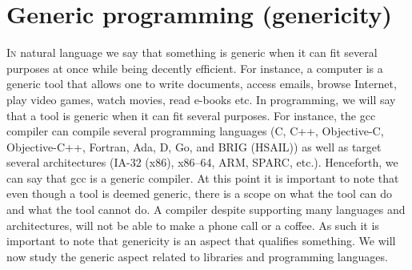 \chapter{Generic programming (genericity)}
\label{chap:genericity}

\lettrine[lines=2]{I}{n} natural language we say that something is generic when it can fit several purposes at once
while being decently efficient. For instance, a computer is a generic tool that allows one to write documents, access
emails, browse Internet, play video games, watch movies, read e-books etc. In programming, we will say that a tool is
generic when it can fit several purposes. For instance, the gcc compiler can compile several programming languages (C,
C++, Objective-C, Objective-C++, Fortran, Ada, D, Go, and BRIG (HSAIL)) as well as target several architectures (IA-32
(x86), x86--64, ARM, SPARC, etc.). Henceforth, we can say that gcc is a generic compiler. At this point it is important
to note that even though a tool is deemed generic, there is a scope on what the tool can do and what the tool cannot do.
A compiler despite supporting many languages and architectures, will not be able to make a phone call or a coffee. As
such it is important to note that genericity is an aspect that qualifies something. We will now study the generic aspect
related to libraries and programming languages.

